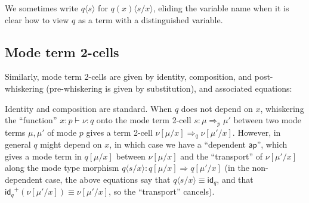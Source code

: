 \documentclass[10pt]{article}
\theoremstyle{definition}
\newcommand{\yields}{\vdash}
\newcommand{\tcell}{\Rightarrow}
\newcommand{\id}{\mathsf{id}}
\newcommand\TypeTwo[4]{\ensuremath{#1 \vdash #2 :  #3 \tcell #4}}
\newcommand\TermTwoT[5]{\ensuremath{#1 \vdash {#2} : #3 \tcell_{#5} #4}}
\newcommand\TrPlus[2]{\ensuremath{{#1}^+(#2)}}
\newcommand\ap[2]{\ensuremath{#1 \langle #2 \rangle }}
\newcommand\ApPlus[2]{\ensuremath{{#1}^+ \langle #2 \rangle }}
\begin{document}
We sometimes write \ap{q}{s} for \ap{q(x)}{s/x}, eliding the variable
name when it is clear how to view $q$ as a term with a distinguished
variable.

\subsection{Mode term 2-cells}

Similarly, mode term 2-cells are given by identity, composition, and
post-whiskering (pre-whiskering is given by substitution), and
associated equations:

Identity and composition are standard.  When $q$ does not depend on $x$,
whiskering the ``function'' $x : p \vdash \nu : q$ onto the mode term
2-cell $s : \mu \tcell_p \mu'$ between two mode terms $\mu,\mu'$ of
mode $p$ gives a term 2-cell $\nu[\mu/x] \tcell_q \nu[\mu'/x]$.
However, in general $q$ might depend on $x$, in which case we have a
``dependent $\mathsf{ap}$'', which gives a mode term in $q[\mu/x]$
between $\nu[\mu/x]$ and the ``transport'' of $\nu[\mu'/x]$ along the
mode type morphism $\ap q {s/x} : q[\mu/x] \tcell q[\mu'/x]$ (in
the non-dependent case, the above equations say that $\ap q {s/x} \equiv
\id_q$, and that $\TrPlus{\id_q}{\nu[\mu'/x]} \equiv {\nu[\mu'/x]}$, so
the ``transport'' cancels).
\end{document}
